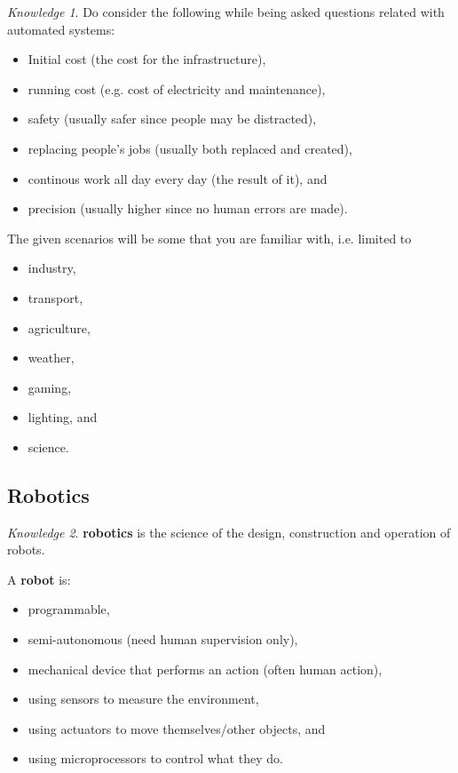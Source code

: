 \documentclass[8pt]{article}
\theoremstyle{remark}
\newtheorem{knowledge}{Knowledge}[subsection]
\begin{document}
            \begin{knowledge}
                Do consider the following while being asked questions related with automated systems:
                \begin{itemize}
                    \item Initial cost (the cost for the infrastructure),
                    \item running cost (e.g. cost of electricity and maintenance),
                    \item safety (usually safer since people may be distracted),
                    \item replacing people's jobs (usually both replaced and created),
                    \item continous work all day every day (the result of it), and
                    \item precision (usually higher since no human errors are made).
                \end{itemize}

                The given scenarios will be some that you are familiar with, i.e. limited to
                \begin{itemize}
                    \item industry,
                    \item transport,
                    \item agriculture,
                    \item weather,
                    \item gaming,
                    \item lighting, and
                    \item science.
                \end{itemize}
            \end{knowledge}

        \subsection{Robotics}

            \begin{knowledge}
                \textbf{robotics} is the science of the design, construction and operation of robots.
                
                A \textbf{robot} is:
                \begin{itemize}
                    \item programmable,
                    \item semi-autonomous (need human supervision only),
                    \item mechanical device that performs an action (often human action),
                    \item using sensors to measure the environment,
                    \item using actuators to move themselves/other objects, and
                    \item using microprocessors to control what they do.
                \end{itemize}
            \end{knowledge}
\end{document}
